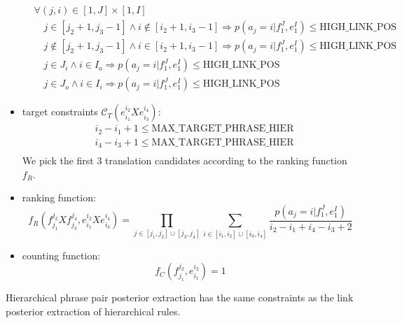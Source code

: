 \begin{itemize}
\begin{equation}
\begin{split}
    & \forall (j,i) \in [1, J] \times [1, I] \\
    & \hspace{1em} j \in [j_2 + 1, j_3 - 1] \wedge i \not\in [i_2 + 1, i_3 - 1] \Rightarrow p(a_j = i | f_1^J, e_1^I) \leq \mbox{HIGH\_LINK\_POS} \\
    & \hspace{1em} j \not\in [j_2 + 1, j_3 - 1] \wedge i \in [i_2 + 1, i_3 - 1] \Rightarrow p(a_j = i | f_1^J, e_1^I) \leq \mbox{HIGH\_LINK\_POS} \\
    & \hspace{1em} j \in J_i \wedge i \in I_o \Rightarrow p(a_j = i | f_1^J,e_1^I) \leq \mbox{HIGH\_LINK\_POS} \\
    & \hspace{1em} j \in J_o \wedge i \in I_i \Rightarrow p(a_j = i | f_1^J,e_1^I) \leq \mbox{HIGH\_LINK\_POS} 
  \end{split}
  \label{eq:alignmentConstraintsLinkHierarchical}
\end{equation}
%
  \item target constraints $\mathcal{C}_T(e_{i_1}^{i_2} X e_{i_3}^{i_4})$:
%
\begin{equation}
  \begin{split}
    & i_2 - i_1 + 1 \leq \mbox{MAX\_TARGET\_PHRASE\_HIER} \\
    & i_4 - i_3 + 1 \leq \mbox{MAX\_TARGET\_PHRASE\_HIER} \\
  \end{split}
\end{equation}
%
We pick the first 3 translation candidates according to the ranking function
$f_R$.
  \item ranking function:
%
\begin{equation} \label{eq:linkPosRankingHierarchical}
  f_R(f_{j_1}^{j_2} X f_{j_3}^{j_4}, e_{i_1}^{i_2} X e_{i_3}^{i_4}) = \prod_{j \in [j_1, j_2] \cup [j_3, j_4]} \sum_{i \in [i_1, i_2] \cup [i_3, i_4]} \frac{p(a_j = i | f_1^J,e_1^I)}{i_2-i_1+i_4-i_3+2}
\end{equation}
%
  \item counting function:
\begin{equation}
  f_C(f_{j_1}^{j_2}, e_{i_1}^{i_2}) = 1
\end{equation}
\end{itemize}
%
Hierarchical phrase pair posterior extraction has the same constraints as the
link posterior extraction of hierarchical rules.

